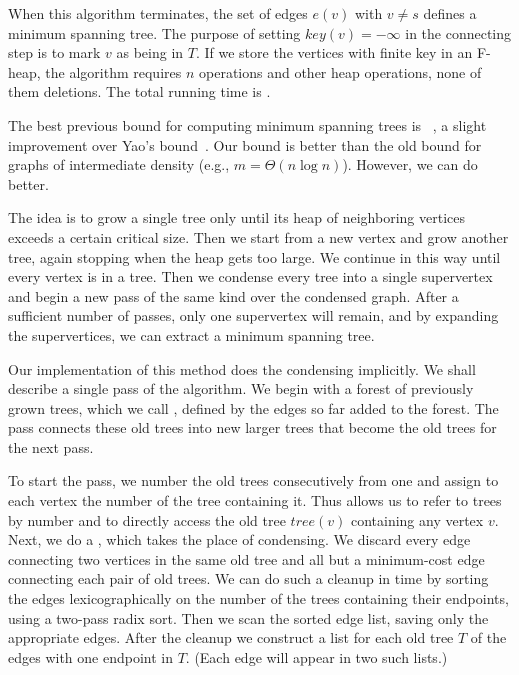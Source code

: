 When this algorithm terminates, the set of edges \(e(v)\) with \(v \neq s\) defines
a minimum spanning tree. The purpose of setting \(key(v) = -\infty\) in the
connecting step is to mark \(v\) as being in \(T\). If we store the vertices with
finite key in an F-heap, the algorithm requires \(n\)  operations and
 other heap operations, none of them deletions. The total running time is
.

The best previous bound for computing minimum spanning trees is ~\cite{CheritonTarjan1976,Tarjan1983}, a slight improvement over
Yao's  bound~\cite{Yao1975}. Our  bound is
better than the old bound for graphs of intermediate density (e.g., \(m = \Theta(n
\log n)\)). However, we can do better.

The idea is to grow a single tree only until its heap of neighboring vertices exceeds
a certain critical size. Then we start from a new vertex and grow another tree, again
stopping when the heap gets too large. We continue in this way until every vertex is
in a tree. Then we condense every tree into a single supervertex and begin a new pass
of the same kind over the condensed graph. After a sufficient number of passes, only
one supervertex will remain, and by expanding the supervertices, we can extract
a minimum spanning tree.

Our implementation of this method does the condensing implicitly. We shall describe
a single pass of the algorithm. We begin with a forest of previously grown trees,
which we call , defined by the edges so far added to the forest. The
pass connects these old trees into new larger trees that become the old trees for the
next pass.

To start the pass, we number the old trees consecutively from one and assign to each
vertex the number of the tree containing it. Thus allows us to refer to trees by
number and to directly access the old tree \(tree(v)\) containing any vertex \(v\).
Next, we do a , which takes the place of condensing. We discard every
edge connecting two vertices in the same old tree and all but a minimum-cost edge
connecting each pair of old trees. We can do such a cleanup in  time by
sorting the edges lexicographically on the number of the trees containing their
endpoints, using a two-pass radix sort. Then we scan the sorted edge list, saving
only the appropriate edges. After the cleanup we construct a list for each old tree
\(T\) of the edges with one endpoint in \(T\). (Each edge will appear in two such
lists.)

